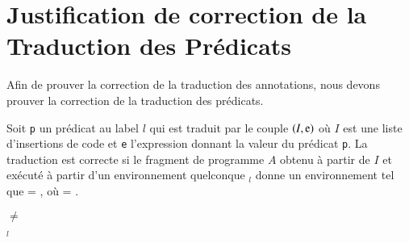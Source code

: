   




\section{Justification de correction de la Traduction des Prédicats}
\label{sec:predicate-translation}


Afin de prouver la correction de la traduction des annotations,
nous devons prouver la correction de la traduction des prédicats.

\begin{myproperty}
  \label{lem:pred-correct}
  Soit \lstinline'p' un prédicat au label $l$ qui est
  traduit par le couple $(I, \mbox{\lstinline'e'})$ où $I$ est une liste
  d'insertions de code et \lstinline'e' l'expression donnant la valeur du
  prédicat \lstinline'p'.
  La traduction est correcte si le fragment de programme $A$ obtenu à partir de
  $I$ et exécuté à partir d'un environnement quelconque \env$_l$ donne un
  environnement \env{} tel que
   = , où
  \env = .
\end{myproperty}

\begin{myproperty}
  \label{lem:pred-noerror}
  \env $\neq$ \errorenv
\end{myproperty}

\begin{myproperty}
  \label{lem:pred-subset}
  \env$_l$ \subenv{} \env
\end{myproperty}


